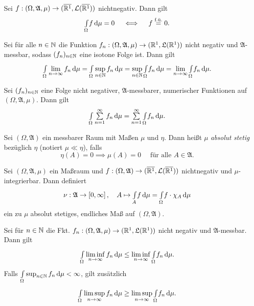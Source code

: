 \documentclass{cheat-sheet}
\newcommand{\Alg}{\mathfrak{A}} %
\newcommand{\LebAlg}{\mathfrak{L}} %
\newcommand{\Leb}{\mathcal{L}} %
\renewcommand{\ER}{\overline{\R^1}} %
\newcommand{\fue}{\overset{\text{f.ü.}}} %
\newcommand{\IntOmu}[1]{\Int{\Omega}{}{#1}{\mu}} %
\begin{document}
\begin{satz}
  Sei $f : (\Omega, \Alg, \mu) \to (\ER, \mathcal{L}(\ER))$ nichtnegativ. Dann gilt
  \[ \IntOmu{f} = 0 \quad \iff \quad f \fue{=} 0. \]
\end{satz}



\begin{satz}
  Sei für alle $n \in \mathbb{N}$ die Funktion $f_n : (\Omega, \Alg, \mu) \to (\R^1, \LebAlg(\R^1))$ nicht negativ und $\Alg$-messbar, sodass $(f_n)_{n \in \mathbb{N}}$ eine isotone Folge ist. Dann gilt
  \[ \IntOmu{\lim_{n \to \infty} f_n} = \IntOmu{\sup_{n \in \N} f_n} = \sup_{n \in \N} \IntOmu{f_n} = \lim_{n \to \infty} \IntOmu{f_n}. \]
\end{satz}

\begin{kor}
  Sei $(f_n)_{n \in \mathbb{N}}$ eine Folge nicht negativer, $\Alg$-messbarer, numerischer Funktionen auf $(\Omega, \Alg, \mu)$. Dann gilt
  \[ \IntOmu{\sum_{n=1}^{\infty} f_n} = \sum_{n=1}^\infty \IntOmu{f_n}. \]
\end{kor}

\begin{defn}
  Sei $(\Omega, \Alg)$ ein messbarer Raum mit Maßen $\mu$ und $\eta$. Dann heißt $\mu$ \emph{absolut stetig} bezüglich $\eta$ (notiert $\mu \ll \eta$), falls
  \[ \eta(A) = 0 \implies \mu(A) = 0 \quad \text{ für alle } A \in \Alg. \]
\end{defn}

\begin{satz}
  Sei $(\Omega, \Alg, \mu)$ ein Maßraum und $f : (\Omega, \Alg) \to (\ER, \Leb(\ER))$ nichtnegativ und $\mu$-integrierbar. Dann definiert
  \[ \nu : \Alg \to \left[0, \infty \right], \quad A \mapsto \Int{A}{}{f}{\mu} = \IntOmu{f \cdot \chi_A} \]
  ein zu $\mu$ absolut stetiges, endliches Maß auf $(\Omega, \Alg)$.
\end{satz}

\begin{lem}[Fatou]
  Sei für $n \in \mathbb{N}$ die Fkt. $f_n : (\Omega, \Alg, \mu) \to (\R^1, \LebAlg(\R^1))$ nicht negativ und $\Alg$-messbar. Dann gilt
  \[ \IntOmu{\liminf_{n \to \infty} f_n} \leq \liminf_{n \to \infty} \IntOmu{f_n}. \]
  Falls $\IntOmu{\sup_{n \in \N} f_n} < \infty$, gilt zusätzlich
  \[ \IntOmu{\limsup_{n \to \infty} f_n} \geq \limsup_{n \to \infty} \IntOmu{f_n}. \]
\end{lem}
\end{document}
